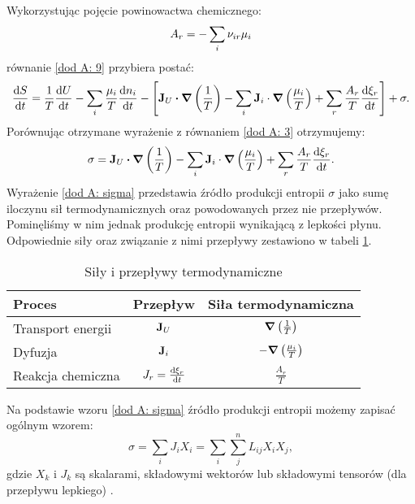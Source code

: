 \documentclass[10pt, a4paper, twoside, onecolumn]{article}
\numberwithin{equation}{section}
\begin{document}
	Wykorzystując pojęcie powinowactwa chemicznego: 
	\begin{equation}
		A_{r}=-\sum_{i}\nu_{ir}\mu_{i} \\
	\end{equation}
	równanie \eqref{dod A: 9} przybiera postać:
	\begin{equation}
		\dv{S}{t}=\frac{1}{T}\dv{U}{t}-\sum_{i}\frac{\mu_{i}}{T}\dv{n_{i}}{t}-\left[\vb{J}_{U}\vdot\grad{\left(\frac{1}{T}\right)}-\sum_{i}\vb{J}_{i}\cdot\grad{\left(\frac{\mu_{i}}{T}\right)}+\sum_{r}\frac{A_{r}}{T}\dv{\xi_{r}}{t}\right]+\sigma.
	\end{equation}
	Porównując otrzymane wyrażenie z równaniem \eqref{dod A: 3} otrzymujemy:
	\begin{equation} \label{dod A: sigma}
		\sigma=\vb{J}_{U}\vdot\grad{\left(\frac{1}{T}\right)}-\sum_{i}\vb{J}_{i}\cdot\grad{\left(\frac{\mu_{i}}{T}\right)}+\sum_{r}\frac{A_{r}}{T}\dv{\xi_{r}}{t}.
	\end{equation}
	Wyrażenie \eqref{dod A: sigma} przedstawia źródło produkcji entropii $\sigma$ jako sumę iloczynu sił termodynamicznych oraz powodowanych przez nie przepływów. Pominęliśmy w nim jednak produkcję entropii wynikającą z lepkości płynu. Odpowiednie siły oraz związanie z nimi przepływy zestawiono w tabeli \ref{tab: sily i przeplywy}.
	\begin{table}[H]
	\centering
	\begin{tabular}{|l|c|c|}
		\hline
		Proces & Przepływ & Siła termodynamiczna \\
		\hline
		Transport energii & \(\vb{J}_{U}\) & \(\grad{\left(\frac{1}{T}\right)}\) \\
		Dyfuzja & \(\vb{J}_i\) & \(-\grad{\left(\frac{\mu_{i}}{T}\right)}\) \\
		Reakcja chemiczna & \(J_{r}=\dv{\xi_{r}}{t}\) & \(\frac{A_r}{T}\) \\
		\hline
	\end{tabular}
	\caption{Siły i przepływy termodynamiczne}
	\label{tab: sily i przeplywy}
	\end{table}\noindent
	Na podstawie wzoru \eqref{dod A: sigma} źródło produkcji entropii możemy zapisać ogólnym wzorem:
	\begin{equation}
		\sigma = \sum_{i}J_{i}X_{i} = \sum_{i}\sum_{j}^{n}L_{ij}X_{i}X_{j},
	\end{equation}
	gdzie $X_{k}$ i $J_{k}$ są skalarami, składowymi wektorów lub składowymi tensorów (dla przepływu lepkiego) \cite{guminski_petelenz}. 
	
\end{document}
